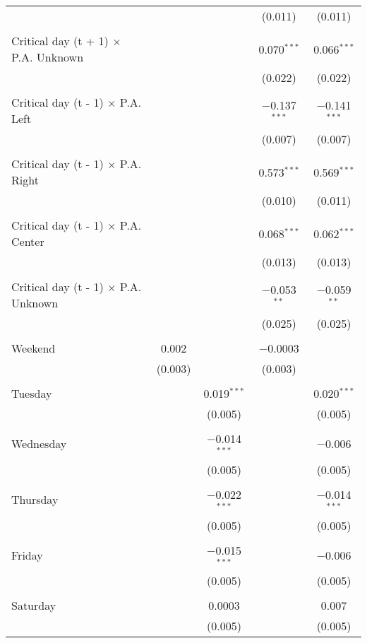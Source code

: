 \documentclass[
]{article}
\begin{document}
\begin{table}[!htbp]
{\begin{tabular}{@{\extracolsep{5pt}}lcccc}
  &  &  & (0.011) & (0.011) \\ 
  & & & & \\ 
 Critical day (t + 1) $\times$ P.A. Unknown &  &  & 0.070$^{***}$ & 0.066$^{***}$ \\ 
  &  &  & (0.022) & (0.022) \\ 
  & & & & \\ 
 Critical day (t - 1) $\times$ P.A. Left &  &  & $-$0.137$^{***}$ & $-$0.141$^{***}$ \\ 
  &  &  & (0.007) & (0.007) \\ 
  & & & & \\ 
 Critical day (t - 1) $\times$ P.A. Right &  &  & 0.573$^{***}$ & 0.569$^{***}$ \\ 
  &  &  & (0.010) & (0.011) \\ 
  & & & & \\ 
 Critical day (t - 1) $\times$ P.A. Center &  &  & 0.068$^{***}$ & 0.062$^{***}$ \\ 
  &  &  & (0.013) & (0.013) \\ 
  & & & & \\ 
 Critical day (t - 1) $\times$ P.A. Unknown &  &  & $-$0.053$^{**}$ & $-$0.059$^{**}$ \\ 
  &  &  & (0.025) & (0.025) \\ 
  & & & & \\ 
 Weekend & 0.002 &  & $-$0.0003 &  \\ 
  & (0.003) &  & (0.003) &  \\ 
  & & & & \\ 
 Tuesday &  & 0.019$^{***}$ &  & 0.020$^{***}$ \\ 
  &  & (0.005) &  & (0.005) \\ 
  & & & & \\ 
 Wednesday &  & $-$0.014$^{***}$ &  & $-$0.006 \\ 
  &  & (0.005) &  & (0.005) \\ 
  & & & & \\ 
 Thursday &  & $-$0.022$^{***}$ &  & $-$0.014$^{***}$ \\ 
  &  & (0.005) &  & (0.005) \\ 
  & & & & \\ 
 Friday &  & $-$0.015$^{***}$ &  & $-$0.006 \\ 
  &  & (0.005) &  & (0.005) \\ 
  & & & & \\ 
 Saturday &  & 0.0003 &  & 0.007 \\ 
  &  & (0.005) &  & (0.005) \\ 

\end{tabular}}
\end{table}
\end{document}
